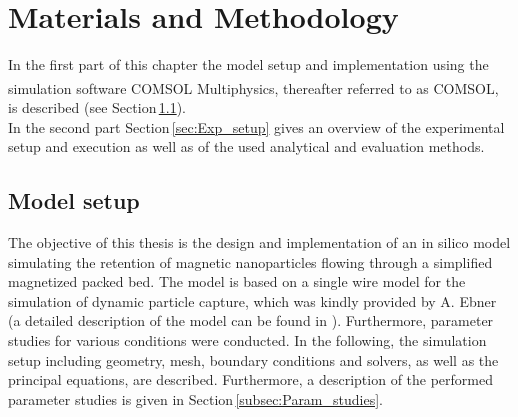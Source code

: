 % 
% 


\chapter{Materials and Methodology}
\label{chap:chap_mat}

In the first part of this chapter the model setup and implementation using the simulation software COMSOL Multiphysics\textsuperscript{\textregistered}, thereafter referred to as COMSOL, is described (see Section\,\ref{sec:Model_setup}).\\
In the second part Section\,\ref{sec:Exp_setup} gives an overview of the experimental setup and execution as well as of the used analytical and evaluation methods.  

\section{Model setup}
\label{sec:Model_setup}
The objective of this thesis is the design and implementation of an in silico model simulating the retention of magnetic nanoparticles flowing through a simplified magnetized packed bed. The model is based on a single wire model for the simulation of dynamic particle capture, which was kindly provided by A. Ebner (a detailed description of the model can be found in \cite{choomphon2017simulation}). Furthermore, parameter studies for various conditions were conducted. In the following, the simulation setup including geometry, mesh, boundary conditions and solvers, as well as the principal equations, are described. Furthermore, a description of the performed parameter studies is given in Section\,\ref{subsec:Param_studies}.     

